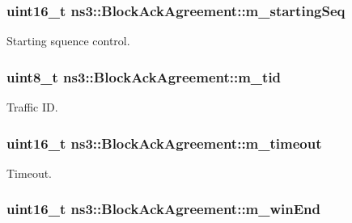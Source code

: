 \subsubsection[{\texorpdfstring{m\+\_\+starting\+Seq}{m_startingSeq}}]{\setlength{\rightskip}{0pt plus 5cm}uint16\+\_\+t ns3\+::\+Block\+Ack\+Agreement\+::m\+\_\+starting\+Seq\hspace{0.3cm}{\ttfamily [protected]}}\hypertarget{classns3_1_1BlockAckAgreement_a8e4caf227b3cbf4cc1a43be50bac37ae}{}\label{classns3_1_1BlockAckAgreement_a8e4caf227b3cbf4cc1a43be50bac37ae}


Starting squence control. 

\subsubsection[{\texorpdfstring{m\+\_\+tid}{m_tid}}]{\setlength{\rightskip}{0pt plus 5cm}uint8\+\_\+t ns3\+::\+Block\+Ack\+Agreement\+::m\+\_\+tid\hspace{0.3cm}{\ttfamily [protected]}}\hypertarget{classns3_1_1BlockAckAgreement_a8c3e7cdd82445f207e41714e1d5d1299}{}\label{classns3_1_1BlockAckAgreement_a8c3e7cdd82445f207e41714e1d5d1299}


Traffic ID. 

\subsubsection[{\texorpdfstring{m\+\_\+timeout}{m_timeout}}]{\setlength{\rightskip}{0pt plus 5cm}uint16\+\_\+t ns3\+::\+Block\+Ack\+Agreement\+::m\+\_\+timeout\hspace{0.3cm}{\ttfamily [protected]}}\hypertarget{classns3_1_1BlockAckAgreement_a7b383c3c3362763e0748d65cb3c5f4da}{}\label{classns3_1_1BlockAckAgreement_a7b383c3c3362763e0748d65cb3c5f4da}


Timeout. 

\subsubsection[{\texorpdfstring{m\+\_\+win\+End}{m_winEnd}}]{\setlength{\rightskip}{0pt plus 5cm}uint16\+\_\+t ns3\+::\+Block\+Ack\+Agreement\+::m\+\_\+win\+End\hspace{0.3cm}{\ttfamily [protected]}}\hypertarget{classns3_1_1BlockAckAgreement_a1e215873b2eb273e9fc2beceb1ea4075}{}\label{classns3_1_1BlockAckAgreement_a1e215873b2eb273e9fc2beceb1ea4075}


